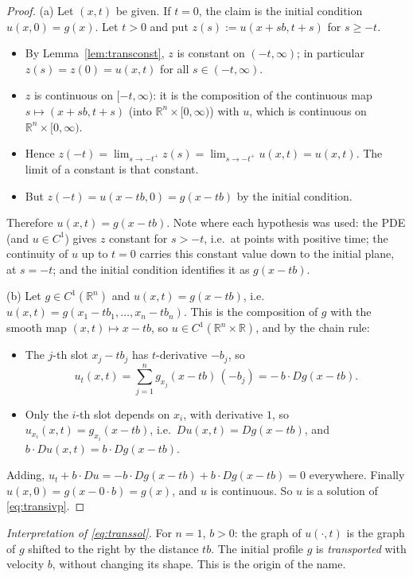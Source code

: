 \documentclass[11pt]{article}
\theoremstyle{plain}
\theoremstyle{definition}
\theoremstyle{remark}
\begin{document}
\begin{proof}
(a) Let $(x,t)$ be given. If $t = 0$, the claim is the initial condition $u(x,0) = g(x)$. Let $t > 0$ and put $z(s) := u(x + sb, t + s)$ for $s \geq -t$.
\begin{itemize}
    \item By Lemma~\ref{lem:transconst}, $z$ is constant on $(-t,\infty)$; in particular $z(s) = z(0) = u(x,t)$ for all $s \in (-t, \infty)$.
    \item $z$ is continuous on $[-t,\infty)$: it is the composition of the continuous map $s \mapsto (x + sb, t + s)$ (into $\mathbb{R}^n \times [0,\infty)$) with $u$, which is continuous on $\mathbb{R}^n \times [0,\infty)$.
    \item Hence $z(-t) = \lim_{s \to -t^+} z(s) = \lim_{s\to -t^+} u(x,t) = u(x,t)$. The limit of a constant is that constant.
    \item But $z(-t) = u(x - tb, 0) = g(x - tb)$ by the initial condition.
\end{itemize}
Therefore $u(x,t) = g(x - tb)$. Note where each hypothesis was used: the PDE (and $u \in C^1$) gives $z$ constant for $s > -t$, i.e.\ at points with positive time; the continuity of $u$ up to $t = 0$ carries this constant value down to the initial plane, at $s = -t$; and the initial condition identifies it as $g(x - tb)$.

(b) Let $g \in C^1(\mathbb{R}^n)$ and $u(x,t) = g(x - tb)$, i.e.\ $u(x,t) = g(x_1 - tb_1, \dots, x_n - tb_n)$. This is the composition of $g$ with the smooth map $(x,t) \mapsto x - tb$, so $u \in C^1(\mathbb{R}^n \times \mathbb{R})$, and by the chain rule:
\begin{itemize}
    \item The $j$-th slot $x_j - tb_j$ has $t$-derivative $-b_j$, so
    $$ u_t(x,t) = \sum_{j=1}^n g_{x_j}(x - tb)\,(-b_j) = -\,b\cdot Dg(x - tb). $$
    \item Only the $i$-th slot depends on $x_i$, with derivative $1$, so $u_{x_i}(x,t) = g_{x_i}(x - tb)$, i.e.\ $Du(x,t) = Dg(x - tb)$, and $b\cdot Du(x,t) = b\cdot Dg(x - tb)$.
\end{itemize}
Adding, $u_t + b\cdot Du = -b\cdot Dg(x - tb) + b\cdot Dg(x - tb) = 0$ everywhere. Finally $u(x,0) = g(x - 0\cdot b) = g(x)$, and $u$ is continuous. So $u$ is a solution of \eqref{eq:transivp}.
\end{proof}

\emph{Interpretation of \eqref{eq:transsol}.} For $n = 1$, $b > 0$: the graph of $u(\cdot,t)$ is the graph of $g$ shifted to the right by the distance $tb$. The initial profile $g$ is \emph{transported} with velocity $b$, without changing its shape. This is the origin of the name.
\end{document}
